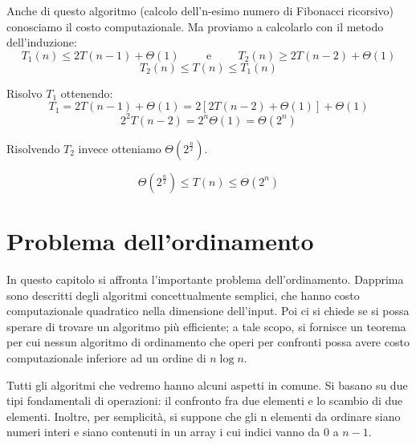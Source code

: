 \begin{itemize}
    Anche di questo algoritmo (calcolo dell'n-esimo numero di Fibonacci ricorsivo) conosciamo il costo computazionale. Ma proviamo a calcolarlo con il metodo dell'induzione:
    \begin{equation*}
        T_1(n)\leq 2T(n-1)+\Theta(1)\hspace{1cm}\text{e}\hspace{1cm}T_2(n)\geq 2T(n-2)+\Theta(1)
    \end{equation*}
    \begin{equation*}
        T_2(n)\leq T(n)\leq T_1(n)
    \end{equation*}
    
    Risolvo $T_1$ ottenendo:
    \begin{equation*}
        T_1=2T(n-1)+\Theta(1)=2[2T(n-2)+\Theta(1)]+\Theta(1)
    \end{equation*}
    \begin{equation*}
        2^2T(n-2)=2^n\Theta(1)=\Theta(2^n)
    \end{equation*}
    
    Risolvendo $T_2$ invece otteniamo $\Theta(2^{\frac{n}{2}})$.
    
    \begin{equation*}
        \Theta(2^\frac{n}{2})\leq T(n)\leq \Theta(2^n)
    \end{equation*}
\end{itemize}

\chapter{Problema dell'ordinamento}
In questo capitolo si affronta l’importante problema dell'ordinamento. Dapprima sono descritti degli algoritmi concettualmente semplici, che hanno
costo computazionale quadratico nella dimensione dell'input. Poi ci si chiede se si possa sperare di trovare un algoritmo più efficiente; a tale
scopo, si fornisce un teorema per cui nessun algoritmo di ordinamento che operi per confronti possa avere costo computazionale inferiore ad un ordine di $n\log n$.

Tutti gli algoritmi che vedremo hanno alcuni aspetti in comune. Si basano su due tipi fondamentali di operazioni: il confronto fra due elementi e lo scambio di due elementi. Inoltre, per semplicità, si suppone che gli n elementi da ordinare siano numeri interi e siano contenuti in un array i cui indici vanno da $0$ a $n-1$. 

